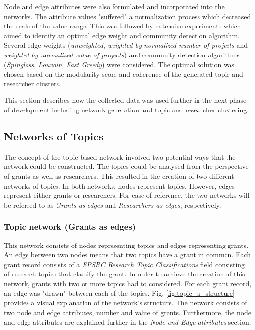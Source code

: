 Node and edge attributes were also formulated and incorporated into the networks. The attribute values "suffered" a normalization process which decreased the scale of the value range. This was followed by extensive experiments which aimed to identify an optimal edge weight and community detection algorithm. Several edge weights (\textit{unweighted}, \textit{weighted by normalized number of projects} and \textit{weighted by normalized value of projects}) and community detection algorithms (\textit{Spinglass}, \textit{Louvain}, \textit{Fast Greedy}) were considered. The optimal solution was chosen based on the modularity score and coherence of the generated topic and researcher clusters.

This section describes how the collected data was used further in the next phase of development including network generation and topic and researcher clustering.

\subsection{Networks of Topics}

The concept of the topic-based network involved two potential ways that the network could be constructed. The topics could be analysed from the perspective of grants as well as researchers. This resulted in the creation of two different networks of topics. In both networks, nodes represent topics. However, edges represent either grants or researchers. For ease of reference, the two networks will be referred to as \textit{Grants as edges} and \textit{Researchers as edges}, respectively.

\subsubsection{Topic network (Grants as edges)}

This network consists of nodes representing topics and edges representing grants. An edge between two nodes means that two topics have a grant in common. Each grant record consists of a \textit{EPSRC Research Topic Classifications} field consisting of research topics that classify the grant. In order to achieve the creation of this network, grants with two or more topics had to considered. For each grant record, an edge was "drawn" between each of the topics. Fig. \ref{fig:topic_a_structure} provides a visual explanation of the network's structure. The network consists of two node and edge attributes, number and value of grants. Furthermore, the node and edge attributes are explained further in the \textit{Node and Edge attributes} section.

